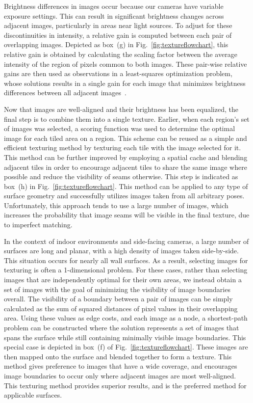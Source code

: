 \documentclass[10pt,twocolumn,twoside]{IEEEtran}
\begin{document}
Brightness differences in images occur because our cameras have variable exposure settings. This can result in significant brightness changes across adjacent images, particularly in areas near light sources. To adjust for these discontinuities in intensity, a relative gain is computed between each pair of overlapping images. Depicted as box~(g) in Fig.~\ref{fig:textureflowchart}, this relative gain is obtained by calculating the scaling factor between the average intensity of the region of pixels common to both images.  These pair-wise relative gains are then used as observations in a least-squares optimization problem, whose solutions results in a single gain for each image that minimizes brightness differences between all adjacent images~\cite{Cheng14}.

Now that images are well-aligned and their brightness has been equalized, the final step is to combine them into a single texture. Earlier, when each region's set of images was selected, a scoring function was used to determine the optimal image for each tiled area on a region. This scheme can be reused as a simple and efficient texturing method by texturing each tile with the image selected for it. This method can be further improved by employing a spatial cache and blending adjacent tiles in order to encourage adjacent tiles to share the same image where possible and reduce the visibility of seams otherwise. This step is indicated as box~(h) in Fig.~\ref{fig:textureflowchart}.  This method can be applied to any type of surface geometry and successfully utilizes images taken from all arbitrary poses. Unfortunately, this approach tends to use a large number of images, which increases the probability that image seams will be visible in the final texture, due to imperfect matching.

In the context of indoor environments and side-facing cameras, a large number of surfaces are long and planar, with a high density of images taken side-by-side. This situation occurs for nearly all wall surfaces. As a result, selecting images for texturing is often a 1-dimensional problem. For these cases, rather than selecting images that are independently optimal for their own areas, we instead obtain a set of images with the goal of minimizing the visibility of image boundaries overall. The visibility of a boundary between a pair of images can be simply calculated as the sum of squared distances of pixel values in their overlapping area. Using these values as edge costs, and each image as a node, a shortest-path problem can be constructed where the solution represents a set of images that spans the surface while still containing minimally visible image boundaries. This special case is depicted in box~(f) of Fig.~\ref{fig:textureflowchart}. These images are then mapped onto the surface and blended together to form a texture. This method gives preference to images that have a wide coverage, and encourages image boundaries to occur only where adjacent images are most well-aligned. This texturing method provides superior results, and is the preferred method for applicable surfaces.
\end{document}
